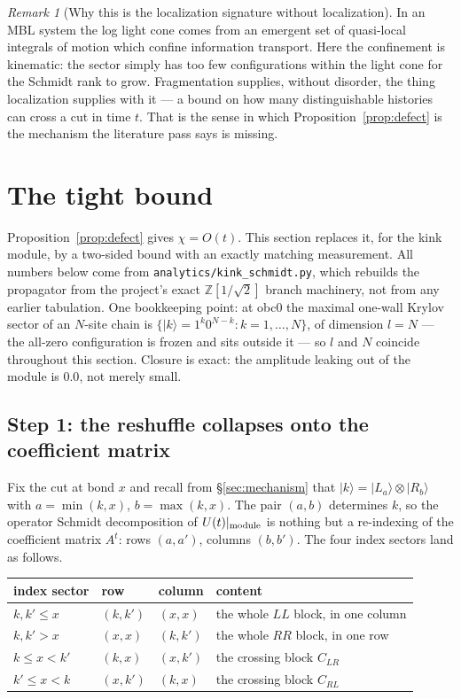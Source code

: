 \documentclass[11pt]{article}
\newcommand{\fn}[1]{\texttt{#1}}
\theoremstyle{plain}
\theoremstyle{remark}
\newtheorem{remark}{Remark}
\begin{document}
\begin{remark}[Why this is the localization signature without localization]
In an MBL system the log light cone comes from an emergent set of quasi-local
integrals of motion which confine information transport. Here the confinement is
kinematic: the sector simply has too few configurations within the light cone
for the Schmidt rank to grow. Fragmentation supplies, without disorder, the
thing localization supplies with it --- a bound on how many distinguishable
histories can cross a cut in time $t$. That is the sense in which
Proposition~\ref{prop:defect} is the mechanism the literature pass says is
missing.
\end{remark}

\section{The tight bound}
\label{sec:tight}

Proposition~\ref{prop:defect} gives $\chi=O(t)$. This section replaces it, for
the kink module, by a two-sided bound with an exactly matching measurement. All
numbers below come from \fn{analytics/kink\_schmidt.py}, which rebuilds the
propagator from the project's exact $\mathbb Z[1/\sqrt2]$ branch machinery, not
from any earlier tabulation. One bookkeeping point: at obc0 the maximal one-wall
Krylov sector of an $N$-site chain is $\{|k\rangle = 1^k0^{N-k}: k=1,\dots,N\}$,
of dimension $l = N$ --- the all-zero configuration is frozen and sits outside
it --- so $l$ and $N$ coincide throughout this section. Closure is exact: the
amplitude leaking out of the module is $0.0$, not merely small.

\subsection{Step 1: the reshuffle collapses onto the coefficient matrix}

Fix the cut at bond $x$ and recall from \S\ref{sec:mechanism} that
$|k\rangle = |L_{a}\rangle\otimes|R_{b}\rangle$ with $a = \min(k,x)$,
$b = \max(k,x)$. The pair $(a,b)$ determines $k$, so the operator Schmidt
decomposition of $U(t)|_{\rm module}$ is nothing but a re-indexing of the
coefficient matrix $A^t$: rows $(a,a')$, columns $(b,b')$. The four index
sectors land as follows.

\begin{center}
\begin{tabular}{llll}
\toprule
index sector & row & column & content \\
\midrule
$k,k'\le x$ & $(k,k')$ & $(x,x)$ & the whole $LL$ block, in one column \\
$k,k'> x$ & $(x,x)$ & $(k,k')$ & the whole $RR$ block, in one row \\
$k\le x<k'$ & $(k,x)$ & $(x,k')$ & the crossing block $C_{LR}$ \\
$k'\le x<k$ & $(x,k')$ & $(k,x)$ & the crossing block $C_{RL}$ \\
\bottomrule
\end{tabular}
\end{center}
\end{document}
